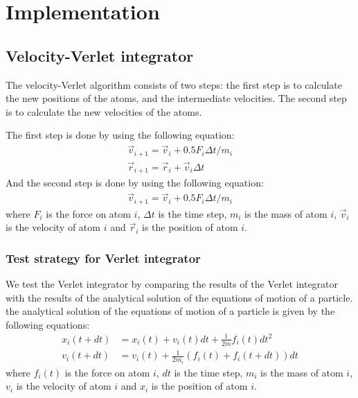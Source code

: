 \chapter{Implementation}\label{chap:Implementation}

\section{Velocity-Verlet integrator}

    The velocity-Verlet algorithm consists of two steps: the first step is to calculate the new positions of the atoms, and the intermediate velocities. The second step is to calculate the new velocities of the atoms.  

    The first step is done by using the following equation:
    \begin{equation}
    \label{eq:verlet1}
        \begin{aligned}
        \vec{v}_{i+1}= \vec{v}_{i} + 0.5 F_{i} \Delta t / m_{i} \\
        \vec{r}_{i+1} = \vec{r}_i + \vec{v}_i \Delta t
        \end{aligned}
    \end{equation}
    And the second step is done by using the following equation:
    \begin{equation}
    \label{eq:verlet2}
        \begin{aligned}
        \vec{v}_{i+1}= \vec{v}_{i} + 0.5 F_{i} \Delta t / m_{i}
        \end{aligned}
    \end{equation}
    where $F_{i}$ is the force on atom $i$, $\Delta t$ is the time step, $m_{i}$ is the mass of atom $i$, $\vec{v}_{i}$ is the velocity of atom $i$ and $\vec{r}_{i}$ is the position of atom $i$. 


    \subsection{Test strategy for Verlet integrator}
    We test the Verlet integrator by comparing the results of the Verlet integrator with the results of the analytical solution of the equations of motion of a particle. the analytical solution of the equations of motion of a particle is given by the following equations:
    \begin{equation}
    \label{eq:analytical}
        \begin{aligned}
        x_i(t+dt) &= x_i(t) + v_i(t)dt + \frac{1}{2m}f_i(t)dt^2 \\
        v_i(t+dt) &= v_i(t) + \frac{1}{2m_i}(f_i(t)+f_i(t+dt))dt
        \end{aligned}
    \end{equation}
    where $f_i(t)$ is the force on atom $i$, $dt$ is the time step, $m_{i}$ is the mass of atom $i$, $v_{i}$ is the velocity of atom $i$ and $x_{i}$ is the position of atom $i$.  

